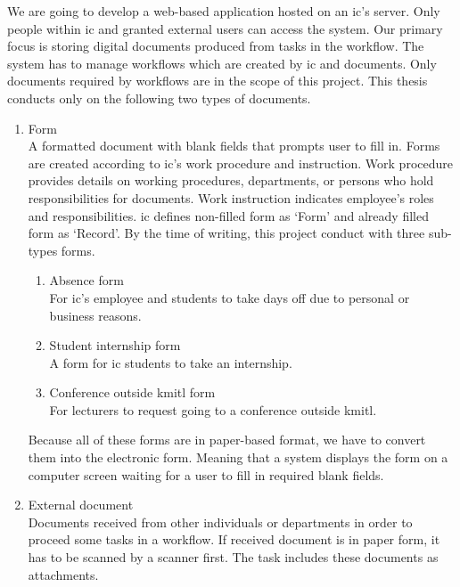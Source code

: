 We are going to develop a web-based application hosted on an \gls{ic}'s server.
Only people within \gls{ic} and granted external users can access the system.
Our primary focus is storing digital documents produced from tasks in the workflow.
The system has to manage workflows which are created by \gls{ic} and documents.
Only documents required by workflows are in the scope of this project.
This thesis conducts only on the following two types of documents.
\begin{enumerate}
\item Form \hfill \\
A formatted document with blank fields that prompts user to fill in.
Forms are created according to \gls{ic}'s work procedure and instruction.
Work procedure provides details on working procedures, departments, or persons who hold responsibilities for documents.
Work instruction indicates employee's roles and responsibilities.
\gls{ic} defines non-filled form as \enquote*{Form} and already filled form as \enquote*{Record}.
By the time of writing, this project conduct with three sub-types forms.
\begin{enumerate}
\item Absence form \hfill \\
For \gls{ic}'s employee and students to take days off due to personal or business reasons.
\item Student internship form \hfill \\
A form for \gls{ic} students to take an internship.
\item Conference outside \gls{kmitl} form \hfill \\
For lecturers to request going to a conference outside \gls{kmitl}.
\end{enumerate}
Because all of these forms are in paper-based format, we have to convert them into the electronic form.
Meaning that a system displays the form on a computer screen waiting for a user to fill in required blank fields.
\item External document \hfill \\
Documents received from other individuals or departments in order to proceed some tasks in a workflow.
If received document is in paper form, it has to be scanned by a scanner first.
The task includes these documents as attachments.
\end{enumerate}